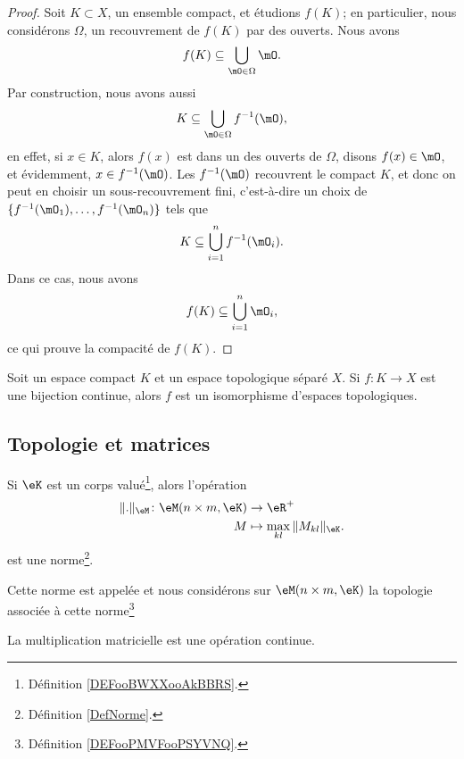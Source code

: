 \begin{proof}
	Soit \( K\subset X\), un ensemble compact, et étudions \( f(K)\); en particulier, nous considérons \( \Omega\), un recouvrement de \( f(K)\) par des ouverts. Nous avons
	\begin{equation}
		f(K)\subseteq\bigcup_{\mO\in\Omega}\mO.
	\end{equation}
	Par construction, nous avons aussi
	\begin{equation}
		K\subseteq\bigcup_{\mO\in\Omega}f^{-1}(\mO),
	\end{equation}
	en effet, si \( x\in K\), alors \( f(x)\) est dans un des ouverts de \( \Omega\), disons \( f(x)\in \mO\), et évidemment, \( x\in f^{-1}(\mO)\).  Les \( f^{-1}(\mO)\) recouvrent le compact \( K\), et donc on peut en choisir un sous-recouvrement fini, c'est-à-dire un choix de \( \{ f^{-1}(\mO_1),\ldots,f^{-1}(\mO_n) \}\) tels que
	\begin{equation}
		K\subseteq \bigcup_{i=1}^nf^{-1}(\mO_i).
	\end{equation}
	Dans ce cas, nous avons
	\begin{equation}
		f(K)\subseteq\bigcup_{i=1}^n\mO_i,
	\end{equation}
	ce qui prouve la compacité de \( f(K)\).
\end{proof}

\begin{lemma}       \label{LEMooNEEVooSeHYzx}
    Soit un espace compact \( K\) et un espace topologique séparé \( X\). Si \( f\colon K\to X\) est une bijection continue, alors \( f\) est un isomorphisme d'espaces topologiques.
\end{lemma}

\subsection{Topologie et matrices}

\begin{lemmaDef}      \label{DEFooCQHDooYpUAhG}
	Si \( \eK\) est un corps valué\footnote{Définition \ref{DEFooBWXXooAkBBRS}.}, alors l'opération
	\begin{equation}
		\begin{aligned}
			\| . \|_{\eM}\colon \eM(n\times m,\eK) & \to \eR^+                             \\
			M                                      & \mapsto  \max_{kl}\| M_{kl} \|_{\eK}.
		\end{aligned}
	\end{equation}
	est une norme\footnote{Définition \ref{DefNorme}.}.

	Cette norme est appelée  et nous considérons sur \( \eM(n\times m, \eK)\) la topologie associée à cette norme\footnote{Définition \ref{DEFooPMVFooPSYVNQ}.}
\end{lemmaDef}

\begin{proposition}     \label{PROPooOEETooPhqWuf}
	La multiplication matricielle est une opération continue.
\end{proposition}
